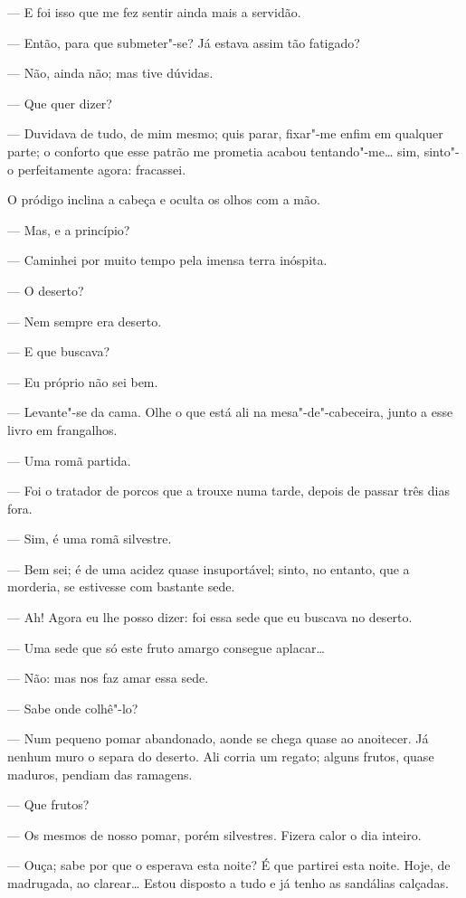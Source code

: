 --- E foi isso que me fez sentir ainda mais a servidão.

--- Então, para que submeter"-se? Já estava assim tão fatigado?

--- Não, ainda não; mas tive dúvidas.

--- Que quer dizer?

--- Duvidava de tudo, de mim mesmo; quis parar, fixar"-me enfim em qualquer
parte; o conforto que esse patrão me prometia acabou tentando"-me\ldots{}
sim, sinto"-o perfeitamente agora: fracassei.

O pródigo inclina a cabeça e oculta os olhos com a mão.

--- Mas, e a princípio?

--- Caminhei por muito tempo pela imensa terra inóspita.

--- O deserto?

--- Nem sempre era deserto.

--- E que buscava?

--- Eu próprio não sei bem.

--- Levante"-se da cama. Olhe o que está ali na mesa"-de"-cabeceira, junto a
esse livro em frangalhos.

--- Uma romã partida.

--- Foi o tratador de porcos que a trouxe numa tarde, depois de passar
três dias fora.

--- Sim, é uma romã silvestre.

--- Bem sei; é de uma acidez quase insuportável; sinto, no entanto, que a
morderia, se estivesse com bastante sede.

--- Ah! Agora eu lhe posso dizer: foi essa sede que eu buscava no deserto.

--- Uma sede que só este fruto amargo consegue aplacar\ldots{}

--- Não: mas nos faz amar essa sede.

--- Sabe onde colhê"-lo?

--- Num pequeno pomar abandonado, aonde se chega quase ao anoitecer. Já
nenhum muro o separa do deserto. Ali corria um regato; alguns frutos,
quase maduros, pendiam das ramagens.

--- Que frutos?

--- Os mesmos de nosso pomar, porém silvestres. Fizera calor o dia
inteiro.

--- Ouça; sabe por que o esperava esta noite? É que partirei esta noite.
Hoje, de madrugada, ao clarear\ldots{} Estou disposto a tudo e já tenho as
sandálias calçadas.

